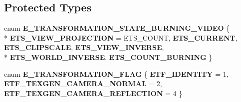 \subsection*{Protected Types}
\begin{DoxyCompactItemize}
\item 
enum {\bfseries E\-\_\-\-T\-R\-A\-N\-S\-F\-O\-R\-M\-A\-T\-I\-O\-N\-\_\-\-S\-T\-A\-T\-E\-\_\-\-B\-U\-R\-N\-I\-N\-G\-\_\-\-V\-I\-D\-E\-O} \{ \\*
{\bfseries E\-T\-S\-\_\-\-V\-I\-E\-W\-\_\-\-P\-R\-O\-J\-E\-C\-T\-I\-O\-N} = E\-T\-S\-\_\-\-C\-O\-U\-N\-T, 
{\bfseries E\-T\-S\-\_\-\-C\-U\-R\-R\-E\-N\-T}, 
{\bfseries E\-T\-S\-\_\-\-C\-L\-I\-P\-S\-C\-A\-L\-E}, 
{\bfseries E\-T\-S\-\_\-\-V\-I\-E\-W\-\_\-\-I\-N\-V\-E\-R\-S\-E}, 
\\*
{\bfseries E\-T\-S\-\_\-\-W\-O\-R\-L\-D\-\_\-\-I\-N\-V\-E\-R\-S\-E}, 
{\bfseries E\-T\-S\-\_\-\-C\-O\-U\-N\-T\-\_\-\-B\-U\-R\-N\-I\-N\-G}
 \}
\item 
enum {\bfseries E\-\_\-\-T\-R\-A\-N\-S\-F\-O\-R\-M\-A\-T\-I\-O\-N\-\_\-\-F\-L\-A\-G} \{ {\bfseries E\-T\-F\-\_\-\-I\-D\-E\-N\-T\-I\-T\-Y} = 1, 
{\bfseries E\-T\-F\-\_\-\-T\-E\-X\-G\-E\-N\-\_\-\-C\-A\-M\-E\-R\-A\-\_\-\-N\-O\-R\-M\-A\-L} = 2, 
{\bfseries E\-T\-F\-\_\-\-T\-E\-X\-G\-E\-N\-\_\-\-C\-A\-M\-E\-R\-A\-\_\-\-R\-E\-F\-L\-E\-C\-T\-I\-O\-N} = 4
 \}
\end{DoxyCompactItemize}
